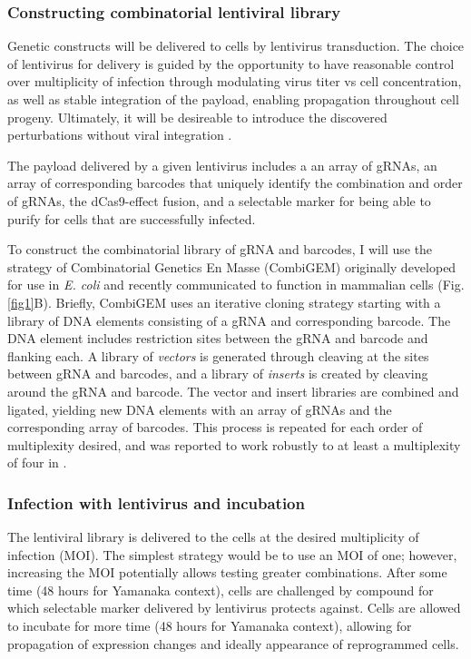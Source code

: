 \documentclass[10pt]{article}
\begin{document}
\subsubsection{Constructing combinatorial lentiviral library}

Genetic constructs will be delivered to cells by lentivirus transduction. The choice of lentivirus for delivery is guided by the opportunity to have reasonable control over multiplicity of infection through modulating virus titer vs cell concentration, as well as stable integration of the payload, enabling propagation throughout cell progeny. Ultimately, it will be desireable to introduce the discovered perturbations without viral integration \cite{warren2010highly} .

The payload delivered by a given lentivirus includes a an array of gRNAs, an array of corresponding barcodes that uniquely identify the combination and order of gRNAs, the dCas9-effect fusion, and a selectable marker for being able to purify for cells that are successfully infected.

To construct the combinatorial library of gRNA and barcodes, I will use the strategy of Combinatorial Genetics En Masse (CombiGEM) \cite{cheng2014enhanced} originally developed for use in \textit{E. coli} and recently communicated to function in mammalian cells \cite{lu2015combigem} (Fig. \ref{fig1}B). Briefly, CombiGEM uses an iterative cloning strategy starting with a library of DNA elements consisting of a gRNA and corresponding barcode. The DNA element includes restriction sites between the gRNA and barcode and flanking each. A library of \textit{vectors} is generated through cleaving at the sites between gRNA and barcodes, and a library of \textit{inserts} is created by cleaving around the gRNA and barcode. The vector and insert libraries are combined and ligated, yielding new DNA elements with an array of gRNAs and the corresponding array of barcodes. This process is repeated for each order of multiplexity desired, and was reported to work robustly to at least a multiplexity of four in \cite{cheng2014enhanced}.

\subsubsection{Infection with lentivirus and incubation}

The lentiviral library is delivered to the cells at the desired multiplicity of infection (MOI). The simplest strategy would be to use an MOI of one; however, increasing the MOI potentially allows testing greater combinations. After some time (48 hours for Yamanaka context), cells are challenged by compound for which selectable marker delivered by lentivirus protects against. Cells are allowed to incubate for more time (48 hours for Yamanaka context), allowing for propagation of expression changes and ideally appearance of reprogrammed cells.
\end{document}
